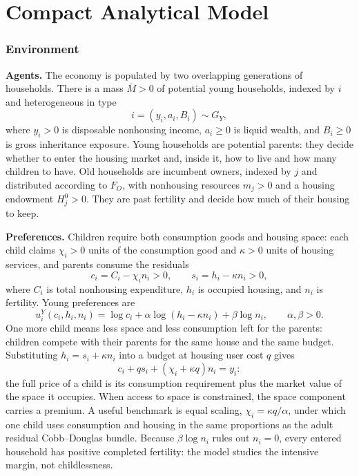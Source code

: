 \documentclass[11pt]{article}
\newcommand{\1}{\mathbf 1}
\begin{document}
\part{Compact Analytical Model}

\section{Environment}

\textbf{Agents.} The economy is populated by two overlapping generations of households. There is a mass $\bar M>0$ of potential young households, indexed by $i$ and heterogeneous in type
\[
i=(y_i,a_i,B_i)\sim G_Y,
\]
where $y_i>0$ is disposable nonhousing income, $a_i\ge0$ is liquid wealth, and $B_i\ge0$ is gross inheritance exposure. Young households are potential parents: they decide whether to enter the housing market and, inside it, how to live and how many children to have. Old households are incumbent owners, indexed by $j$ and distributed according to $F_O$, with nonhousing resources $m_j>0$ and a housing endowment $H_j^0>0$. They are past fertility and decide how much of their housing to keep.

\textbf{Preferences.} Children require both consumption goods and housing space: each child claims $\chi_i>0$ units of the consumption good and $\kappa>0$ units of housing services, and parents consume the residuals
\[
c_i=C_i-\chi_i n_i>0,
\qquad
s_i=h_i-\kappa n_i>0,
\]
where $C_i$ is total nonhousing expenditure, $h_i$ is occupied housing, and $n_i$ is fertility. Young preferences are
\[
u_i^Y(c_i,h_i,n_i)=
\log c_i+\alpha\log(h_i-\kappa n_i)+\beta\log n_i,
\qquad \alpha,\beta>0.
\]
One more child means less space and less consumption left for the parents: children compete with their parents for the same house and the same budget. Substituting $h_i=s_i+\kappa n_i$ into a budget at housing user cost $q$ gives
\[
c_i+q s_i+\left(\chi_i+\kappa q\right)n_i=y_i:
\]
the full price of a child is its consumption requirement plus the market value of the space it occupies. When access to space is constrained, the space component carries a premium. A useful benchmark is equal scaling, $\chi_i=\kappa q/\alpha$, under which one child uses consumption and housing in the same proportions as the adult residual Cobb--Douglas bundle. Because $\beta\log n_i$ rules out $n_i=0$, every entered household has positive completed fertility: the model studies the intensive margin, not childlessness.
\end{document}
